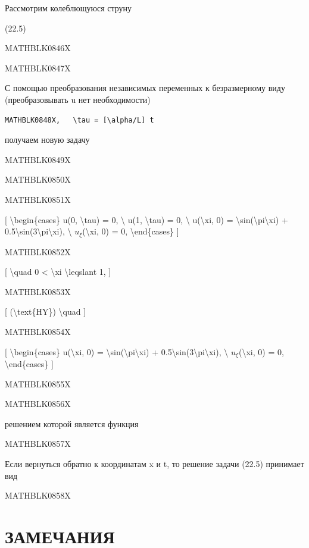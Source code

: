 \documentclass[
]{article}
\begin{document}
{{Рассмотрим колеблющуюся струну

(22.5)

MATHBLK0846X

MATHBLK0847X

С помощью преобразования независимых переменных к безразмерному виду
(преобразовывать u нет необходимости)

\begin{verbatim}
MATHBLK0848X,   \tau = [\alpha/L] t
\end{verbatim}

получаем новую задачу

MATHBLK0849X

MATHBLK0850X

MATHBLK0851X

{[} \textbackslash begin\{cases\} u(0, \textbackslash tau) = 0,
\textbackslash{} u(1, \textbackslash tau) = 0, \textbackslash{}
u(\textbackslash xi, 0) =
\textbackslash sin(\textbackslash pi\textbackslash xi) +
0.5\textbackslash sin(3\textbackslash pi\textbackslash xi),
\textbackslash{} \(u_{\xi}\)(\textbackslash xi, 0) = 0,
\textbackslash end\{cases\} {]}

MATHBLK0852X

{[} \textbackslash quad 0 \textless{} \textbackslash xi
\textbackslash leqslant 1, {]}

MATHBLK0853X

{[} (\textbackslash text\{HY\}) \textbackslash quad {]}

MATHBLK0854X

{[} \textbackslash begin\{cases\} u(\textbackslash xi, 0) =
\textbackslash sin(\textbackslash pi\textbackslash xi) +
0.5\textbackslash sin(3\textbackslash pi\textbackslash xi),
\textbackslash{} \(u_{\xi}\)(\textbackslash xi, 0) = 0,
\textbackslash end\{cases\} {]}

MATHBLK0855X

MATHBLK0856X

решением которой является функция

MATHBLK0857X

Если вернуться обратно к координатам x и t, то решение задачи (22.5)
принимает вид

MATHBLK0858X

\section{ЗАМЕЧАНИЯ}\label{ux437ux430ux43cux435ux447ux430ux43dux438ux44f-6}

}}
\end{document}
